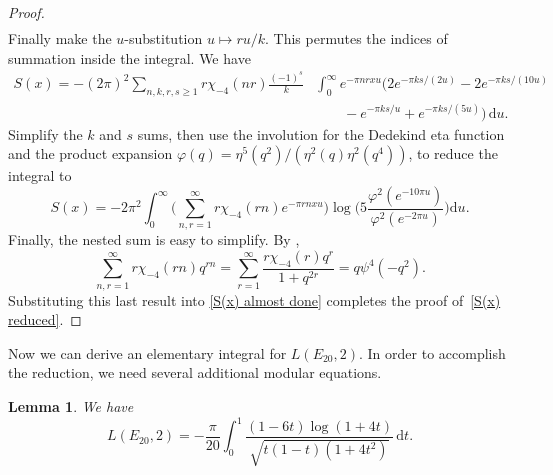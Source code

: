 \documentclass[12pt,reqno]{amsart}
\newtheorem{lemma}{Lemma}
\theoremstyle{remark}
\begin{document}
\begin{proof}
\begin{equation*}
\begin{split}
\end{split}
\end{equation*}
Finally make the $u$-substitution $u\mapsto r u/k$. This
permutes the indices of summation inside the integral. We have
\begin{equation*}
\begin{split}
S(x)=-(2\pi)^2\sum_{n,k,r,s\ge 1}r\chi_{-4}(n r)\frac{(-1)^s}{k}
&\int_{0}^{\infty}e^{-\pi n r x u}(2e^{-\pi k s/(2 u)}-2e^{-\pi k s/(10 u)}
\\ &\qquad
-e^{-\pi k s/u}+e^{-\pi k s/(5 u)})\, {{\mathrm d}} u.
\end{split}
\end{equation*}
Simplify the $k$ and $s$ sums, then use the involution for the
Dedekind eta function and the product expansion
$\varphi(q)=\eta^5(q^2)/(\eta^2(q)\eta^2(q^4))$, to reduce the integral to
\begin{equation}\label{S(x) almost done}
S(x)=-2\pi^2\int_{0}^{\infty}\biggl(\sum_{n,r=1}^{\infty}r\chi_{-4}(r n)e^{-\pi r n x u}\biggr)
\log\biggl(5\frac{\varphi^2(e^{-10 \pi u})}{\varphi^2(e^{-2\pi u})}\biggr){{\mathrm d}} u.
\end{equation}
Finally, the nested sum is easy to simplify.  By \cite[pg.~139, Example 3]{Be3},
\begin{equation*}
\sum_{n,r=1 }^{\infty}r\chi_{-4}(r n)q^{r n}
=\sum_{r=1}^{\infty}\frac{r\chi_{-4}(r)q^{r}}{1+q^{2r}}
=q\psi^4(-q^2).
\end{equation*}
Substituting this last result into \eqref{S(x) almost done}
completes the proof of~\eqref{S(x) reduced}.
\end{proof}

Now we can derive an elementary integral for $L(E_{20},2)$. In order
to accomplish the reduction, we need several additional modular
equations.

\begin{lemma}
We have
\begin{equation}\label{F(1,5) elementary integral}
L(E_{20},2)=-\frac{\pi}{20}\int_{0}^{1}\frac{(1-6t)\log(1+4t)}{\sqrt{t(1-t)(1+4t^2)}}\,{{\mathrm d}}
t.
\end{equation}
\end{lemma}
\end{document}
